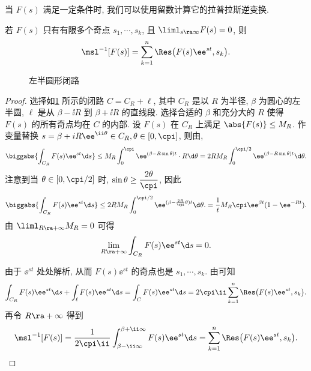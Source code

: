 当 $F(s)$ 满足一定条件时, 我们可以使用留数计算它的拉普拉斯逆变换.

\begin{theorem}
  若 $F(s)$ 只有有限多个奇点 $s_1,\cdots,s_k$, 且 $\liml_{s\ra\infty}F(s)=0$, 则
  \[
    \msl^{-1}[F(s)]
    =\sum_{k=1}^n \Res\bigl(F(s)\ee^{st},s_k\bigr).
  \]
\end{theorem}

\begin{figure}[H]
  \centering
  \caption{左半圆形闭路}
  \label{fig:left-half-circle-contour}
\end{figure}

\begin{proof}
  选择如\ref{fig:left-half-circle-contour} 所示的闭路 $C=C_R+\ell$, 其中 $C_R$ 是以 $R$ 为半径, $\beta$ 为圆心的左半圆, $\ell$ 是从 $\beta-\ii R$ 到 $\beta+\ii R$ 的直线段.
  选择合适的 $\beta$ 和充分大的 $R$ 使得 $F(s)$ 的所有奇点均在 $C$ 的内部.
  设 $F(s)$ 在 $C_R$ 上满足 $\abs{F(s)}\le M_R$.
  作变量替换 $s=\beta+iR\ee^{\ii\theta}\in C_R,\theta\in[0,\cpi]$, 则由\thmGrowUp,
  \[
     \biggabs{\int_{C_R} F(s)\ee^{st}\d s}
    \le M_R \int_0^\cpi \ee^{(\beta-R\sin \theta)t} \cdot R\d \theta
    =2RM_R\int_0^{\cpi/2}\ee^{(\beta-R\sin \theta)t}\d \theta.
  \]
  注意到当 $\theta\in[0,\cpi/2]$ 时, $\sin\theta\ge \dfrac{2\theta}\cpi$, 因此
  \[
     \biggabs{\int_{C_R} F(s)\ee^{st}\d s}
    \le2RM_R\int_0^{\cpi/2}\ee^{(\beta-\frac{2R}{\cpi}\theta)t}\d \theta.
    =\frac1tM_R\cpi\ee^{\beta t}(1-\ee^{-Rt}).
  \]
  由 $\liml_{R\ra+\infty} M_R=0$ 可得
  \[
    \lim_{R\ra+\infty} \int_{C_R} F(s)\ee^{st}\d s=0.
  \]

  由于 $\ee^{st}$ 处处解析, 从而 $F(s)\ee^{st}$ 的奇点也是 $s_1,\cdots,s_k$.
  由\thmRes 可知
  \[
    \int_{C_R} F(s)\ee^{st}\d s+\int_\ell F(s)\ee^{st}\d s
    =\int_C F(s)\ee^{st}\d s
    =2\cpi\ii\sum_{k=1}^n\Res\bigl(F(s)\ee^{st},s_k\bigr).
  \]
  再令 $R\ra+\infty$ 得到
  \[
     \msl^{-1}[F(s)]
    =\frac1{2\cpi\ii}\int_{\beta-\ii\infty}^{\beta+\ii\infty} F(s)\ee^{st}\d s
    =\sum_{k=1}^n\Res\bigl(F(s)\ee^{st},s_k\bigr).
    \qedhere
  \]
\end{proof}

